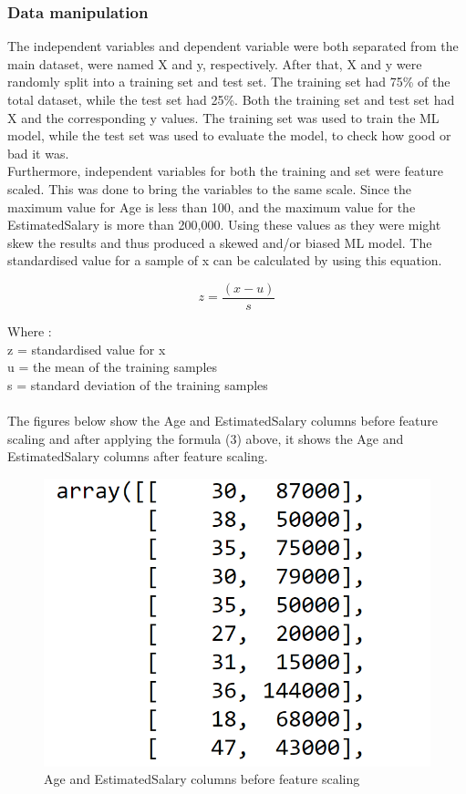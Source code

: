 \documentclass[conference]{IEEEtran}
\begin{document}
\subsubsection{Data manipulation}
The independent variables and dependent variable were both separated from the main dataset, were named X and y, respectively.
After that, X and y were randomly split into a training set and test set. The training set had 75\% of the total dataset, while the test set had 25\%. Both the training set and test set had X and the corresponding y values.
The training set was used to train the ML model, while the test set was used to evaluate the model, to check how good or bad it was.\\
Furthermore, independent variables for both the training and set were feature scaled. This was done to bring the variables to the same scale. Since the maximum value for Age is less than 100, and the maximum value for the EstimatedSalary is more than 200,000. Using these values as they were might skew the results and thus produced a skewed and/or biased ML model. The standardised value for a sample of x can be calculated by using this equation.

\begin{equation} 
\label{equ3}
z = \frac{(x-u)}{s}
\end{equation} 

Where :\\
z = standardised value for x\\
u = the mean of the training samples\\
s = standard deviation of the training samples\\
\\
The figures below show the Age and EstimatedSalary columns before feature scaling and after applying the formula (3) above, it shows the Age and EstimatedSalary columns after feature scaling.

\begin{figure}[h]
    \centering
    \includegraphics[scale=0.40]{figs/beforeFscaling.png}
    \caption{Age and EstimatedSalary columns before feature scaling}
    \label{dabc}        
\end{figure}
\end{document}
